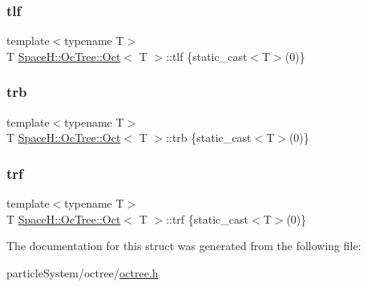 \subsubsection{\texorpdfstring{tlf}{tlf}}
{\footnotesize\ttfamily template$<$typename T$>$ \\
T \mbox{\hyperlink{struct_space_h_1_1_oc_tree_1_1_oct}{Space\+H\+::\+Oc\+Tree\+::\+Oct}}$<$ T $>$\+::tlf \{static\+\_\+cast$<$T$>$(0)\}}

\mbox{\label{struct_space_h_1_1_oc_tree_1_1_oct_a75d776212702a914b6238b7bc2c3aacc}} 
\subsubsection{\texorpdfstring{trb}{trb}}
{\footnotesize\ttfamily template$<$typename T$>$ \\
T \mbox{\hyperlink{struct_space_h_1_1_oc_tree_1_1_oct}{Space\+H\+::\+Oc\+Tree\+::\+Oct}}$<$ T $>$\+::trb \{static\+\_\+cast$<$T$>$(0)\}}

\mbox{\label{struct_space_h_1_1_oc_tree_1_1_oct_a5216deb04bc777d394bc21c0dfa3215a}} 
\subsubsection{\texorpdfstring{trf}{trf}}
{\footnotesize\ttfamily template$<$typename T$>$ \\
T \mbox{\hyperlink{struct_space_h_1_1_oc_tree_1_1_oct}{Space\+H\+::\+Oc\+Tree\+::\+Oct}}$<$ T $>$\+::trf \{static\+\_\+cast$<$T$>$(0)\}}



The documentation for this struct was generated from the following file\+:\begin{DoxyCompactItemize}
\item 
particle\+System/octree/\mbox{\hyperlink{octree_8h}{octree.\+h}}\end{DoxyCompactItemize}
